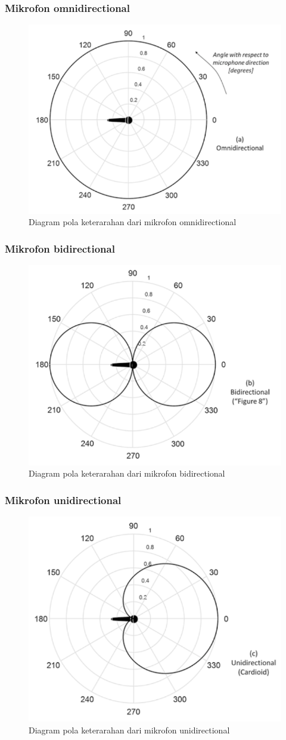 \documentclass[pdflatex,compress]{beamer}
\begin{document}
\begin{frame}
	\frametitle{Mikrofon omnidirectional}
	\begin{figure}
		\centering
		\includegraphics[width=0.6\linewidth]{img/img014a}
		\caption{Diagram pola keterarahan dari mikrofon omnidirectional}
	\end{figure}
\end{frame}

\begin{frame}
	\frametitle{Mikrofon bidirectional}
	\begin{figure}
		\centering
		\includegraphics[width=0.6\linewidth]{img/img014b}
		\caption{Diagram pola keterarahan dari mikrofon bidirectional}
	\end{figure}
\end{frame}

\begin{frame}
	\frametitle{Mikrofon unidirectional}
	\begin{figure}
		\centering
		\includegraphics[width=0.6\linewidth]{img/img014c}
		\caption{Diagram pola keterarahan dari mikrofon unidirectional}
	\end{figure}
\end{frame}
\end{document}
